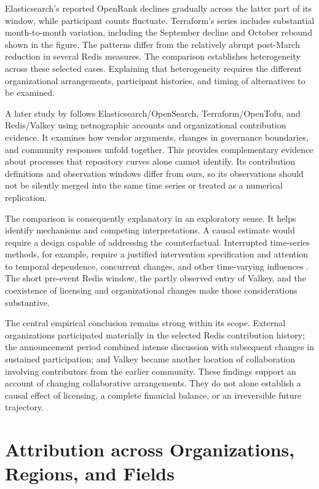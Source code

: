 Elasticsearch's reported OpenRank declines gradually across the latter part of its window, while participant counts fluctuate. Terraform's series includes substantial month-to-month variation, including the September decline and October rebound shown in the figure. The patterns differ from the relatively abrupt post-March reduction in several Redis measures. The comparison establishes heterogeneity across these selected cases. Explaining that heterogeneity requires the different organizational arrangements, participant histories, and timing of alternatives to be examined.

A later study by \citet{foster2026} follows Elasticsearch/OpenSearch, Terraform/OpenTofu, and Redis/Valkey using netnographic accounts and organizational contribution evidence. It examines how vendor arguments, changes in governance boundaries, and community responses unfold together. This provides complementary evidence about processes that repository curves alone cannot identify. Its contribution definitions and observation windows differ from ours, so its observations should not be silently merged into the same time series or treated as a numerical replication.

The comparison is consequently explanatory in an exploratory sense. It helps identify mechanisms and competing interpretations. A causal estimate would require a design capable of addressing the counterfactual. Interrupted time-series methods, for example, require a justified intervention specification and attention to temporal dependence, concurrent changes, and other time-varying influences \citep{bernal2017}. The short pre-event Redis window, the partly observed entry of Valkey, and the coexistence of licensing and organizational changes make those considerations substantive.

The central empirical conclusion remains strong within its scope. External organizations participated materially in the selected Redis contribution history; the announcement period combined intense discussion with subsequent changes in sustained participation; and Valkey became another location of collaboration involving contributors from the earlier community. These findings support an account of changing collaborative arrangements. They do not alone establish a causal effect of licensing, a complete financial balance, or an irreversible future trajectory.

\section{Attribution across Organizations, Regions, and Fields}
\label{sec:ch9-mapping}

